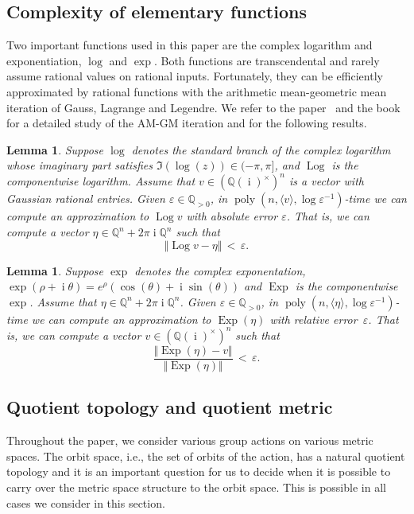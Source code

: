 \documentclass[10pt,a4paper]{article}
\newtheorem{lemma}[theorem]{Lemma}
\theoremstyle{definition}
\DeclareMathOperator{\poly}{poly}
\DeclareMathOperator{\ii}{i}
\DeclareMathOperator{\Log}{Log}
\DeclareMathOperator{\Exp}{Exp}
\newcommand{\QQ}{\mathbb{Q}}
\numberwithin{equation}{section}
\begin{document}
\subsection{Complexity of elementary functions}
Two important functions used in this paper are the complex logarithm and exponentiation, $\log$ and $\exp$.
Both functions are transcendental and rarely assume rational values on rational inputs.
Fortunately, they can be efficiently approximated by rational functions with
the arithmetic mean-geometric mean iteration of Gauss, Lagrange and Legendre.
We refer to the paper~\cite{BorweinBorwein:88} and the book~\cite{agm} for a detailed study of the AM-GM iteration
and for the following results.

\begin{lemma}
\label{lem:log}
 Suppose $\log$ denotes the standard branch of the complex logarithm whose imaginary part satisfies $\Im(\log(z))\in (-\pi,\pi]$, and $\Log$ is the componentwise logarithm. Assume that $v\in(\QQ(\ii)^\times)^n$ is a vector with Gaussian rational entries.
 Given $\varepsilon\in\QQ_{>0}$, in $\poly(n,\langle v\rangle,\log\varepsilon^{-1})$-time we can compute an approximation to
 $\Log v$ with absolute error $\varepsilon$. That is, we can compute a vector $\eta\in\QQ^n+2\pi\ii\QQ^n$ such that
 \[
	\Vert \Log v-\eta\Vert\,<\,\varepsilon.
 \]
\end{lemma}

\begin{lemma}
\label{lem:exp}
 Suppose $\exp$ denotes the complex exponentation, $\exp(\rho+\ii\theta)=e^{\rho}(\cos(\theta)+\ii\sin(\theta))$ and
 $\Exp$ is the componentwise $\exp$. Assume that $\eta\in \QQ^n+2\pi\ii\QQ^n$.
 Given $\varepsilon\in\QQ_{>0}$, in $\poly(n,\langle \eta\rangle,\log\varepsilon^{-1})$-time
 we can compute an approximation to $\Exp(\eta)$ with relative error~$\varepsilon$.
 That is, we can compute a vector $v\in(\QQ(\ii)^\times)^n$ such that
 \[
	\frac{\Vert \Exp(\eta)-v\Vert}{\Vert \Exp(\eta)\Vert}\,<\,\varepsilon.
 \]
\end{lemma}

\subsection{Quotient topology and quotient metric}\label{sec:quotients}
Throughout the paper, we consider various group actions on various metric spaces. The orbit space, i.e.,
the set of orbits of the action, has a natural quotient topology and it is an important question for us to decide
when it is possible to carry over the metric space structure to the orbit space.
This is possible in all cases we consider in this section.
\end{document}
